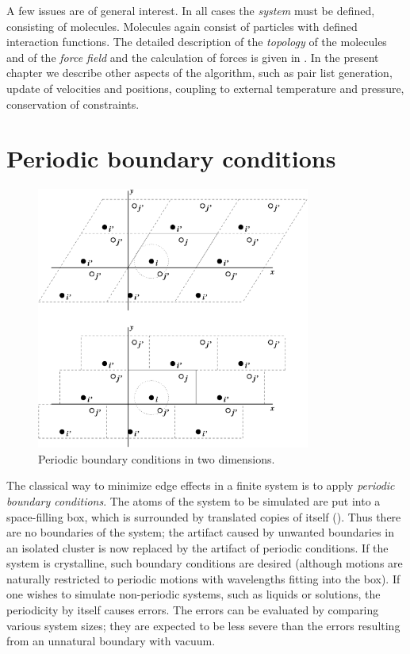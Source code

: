 
A few issues are of general interest. In all cases the {\em system}
must be defined, consisting of molecules. Molecules again consist of
particles  with defined interaction functions. The detailed
description of the {\em topology} of the molecules and of the {\em force
field} and the calculation of forces is given in
. In the present chapter we describe
other aspects of the algorithm, such as pair list generation, update of
velocities  and positions, coupling to external temperature and
pressure,  conservation of constraints. 

\section{Periodic boundary conditions}
\label{sec:pbc}
\begin{figure}
\centerline{\includegraphics[width=9cm]{plots/pbctric}}
\caption {Periodic boundary conditions in two dimensions.}
\label{fig:pbc}
\end{figure}
The classical way to minimize edge effects in a finite system is to
apply {\em periodic boundary conditions}. The atoms of the system to
be simulated are put into a space-filling box, which is surrounded by
translated copies of itself ().  Thus there are no
boundaries of the system; the artifact caused by unwanted boundaries
in an isolated cluster is now replaced by the artifact of periodic
conditions. If the system is crystalline, such boundary conditions are
desired (although motions are naturally restricted to periodic motions
with wavelengths fitting into the box). If one wishes to simulate
non-periodic systems, such as liquids or solutions, the periodicity by
itself causes errors. The errors can be evaluated by comparing various
system sizes; they are expected to be less severe than the errors
resulting from an unnatural boundary with vacuum.

